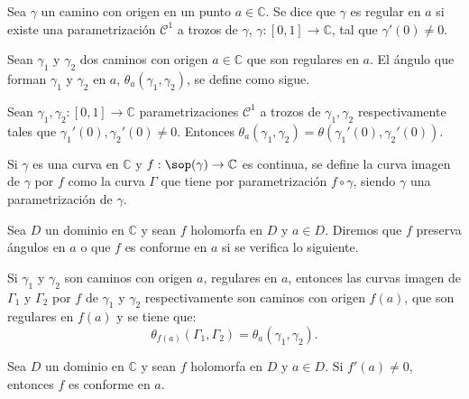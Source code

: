 \begin{definition}
    Sea $\gamma$ un camino con origen en un punto $a \in \mathbb{C}$.
    Se dice que $\gamma$ es regular en $a$ si existe una parametrización $\mathcal{C}^1$ a trozos de $\gamma$, $\gamma: [0, 1] \to \mathbb{C}$, tal que $\gamma'(0) \neq 0$.
\end{definition}

\begin{definition}
    Sean $\gamma_1$ y $\gamma_2$ dos caminos con origen $a \in \mathbb{C}$ que son regulares en $a$.
    El ángulo que forman $\gamma_1$ y $\gamma_2$ en $a$, $\theta_a(\gamma_1, \gamma_2)$, se define como sigue.

    Sean $\gamma_1, \gamma_2: [0, 1] \to \mathbb{C}$ parametrizaciones $\mathcal{C}^1$ a trozos de $\gamma_1, \gamma_2$ respectivamente tales que $\gamma_1'(0), \gamma_2'(0) \neq 0$.
    Entonces $\theta_a(\gamma_1, \gamma_2) = \theta(\gamma_1'(0), \gamma_2'(0))$.
\end{definition}

\begin{definition}
    Si $\gamma$ es una curva en $\mathbb{C}$ y $f: \sop(\gamma) \to \mathbb{C}$ es continua, se define la curva imagen de $\gamma$ por $f$ como la curva $\Gamma$ que tiene por parametrización $f \circ \gamma$, siendo $\gamma$ una parametrización de $\gamma$.
\end{definition}

\begin{definition}
    Sea $D$ un dominio en $\mathbb{C}$ y sean $f$ holomorfa en $D$ y $a \in D$.
    Diremos que $f$ preserva ángulos en $a$ o que $f$ es conforme en $a$ si se verifica lo siguiente.

    Si $\gamma_1$ y $\gamma_2$ son caminos con origen $a$, regulares en $a$, entonces las curvas imagen de $\Gamma_1$ y $\Gamma_2$ por $f$ de $\gamma_1$ y $\gamma_2$ respectivamente son caminos con origen $f(a)$, que son regulares en $f(a)$ y se tiene que:
    $$\theta_{f(a)}(\Gamma_1, \Gamma_2) = \theta_a(\gamma_1, \gamma_2).$$
\end{definition}

\begin{theorem}
    Sea $D$ un dominio en $\mathbb{C}$ y sean $f$ holomorfa en $D$ y $a \in D$.
    Si $f'(a) \neq 0$, entonces $f$ es conforme en $a$.
\end{theorem}

